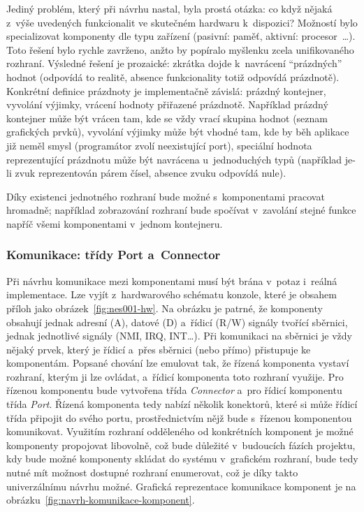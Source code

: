 Jediný problém, který při návrhu nastal, byla prostá otázka: co když nějaká z~výše uvedených funkcionalit ve skutečném hardwaru k~dispozici? Možností bylo specializovat komponenty dle typu zařízení (pasivní: paměť, aktivní: procesor~\dots). Toto řešení bylo rychle zavrženo, anžto by popíralo myšlenku zcela unifikovaného rozhraní. Výsledné řešení je prozaické: zkrátka dojde k~navrácení \enquote{prázdných} hodnot (odpovídá to realitě, absence funkcionality totiž odpovídá prázdnotě). Konkrétní definice prázdnoty je implementačně závislá: prázdný kontejner, vyvolání výjimky, vrácení hodnoty přiřazené prázdnotě. Například prázdný kontejner může být vrácen tam, kde se vždy vrací skupina hodnot (seznam grafických prvků), vyvolání výjimky může být vhodné tam, kde by běh aplikace již neměl smysl (programátor zvolí neexistující port), speciální hodnota reprezentující prázdnotu může být navrácena u~jednoduchých typů (například je-li zvuk reprezentován párem čísel, absence zvuku odpovídá nule).

Díky existenci jednotného rozhraní bude možné s~komponentami pracovat hromadně; například zobrazování rozhraní bude spočívat v~zavolání stejné funkce napříč všemi komponentami v~jednom kontejneru.

\subsubsection{Komunikace: třídy Port a~Connector}
\label{sec:port-connector}
Při návrhu komunikace mezi komponentami musí být brána v~potaz i~reálná implementace. Lze vyjít z~hardwarového schématu konzole, které je obsahem příloh jako obrázek~\ref{fig:nes001-hw}. Na obrázku je patrné, že komponenty obsahují jednak adresní (A), datové (D) a~řídicí  (R/W) signály tvořící sběrnici, jednak jednotlivé signály (NMI, IRQ, INT\dots). Při komunikaci na sběrnici je vždy nějaký prvek, který je řídicí a~přes sběrnici (nebo přímo) přistupuje ke komponentám. Popsané chování lze emulovat tak, že řízená komponenta vystaví rozhraní, kterým ji lze ovládat, a~řídicí komponenta toto rozhraní využije. Pro řízenou komponentu bude vytvořena třída \emph{Connector} a~pro řídicí komponentu třída \emph{Port}. Řízená komponenta tedy nabízí několik konektorů, které si může řídicí třída připojit do svého portu, prostřednictvím nějž bude s~řízenou komponentou komunikovat. Využitím rozhraní odděleného od konkrétních komponent je možné komponenty propojovat libovolně, což bude důležité v~budoucích fázích projektu, kdy bude možné komponenty skládat do systému v~grafickém rozhraní, bude tedy nutné mít možnost dostupné rozhraní enumerovat, což je díky takto univerzálnímu návrhu možné. Grafická reprezentace komunikace komponent je na obrázku~\ref{fig:navrh-komunikace-komponent}.

